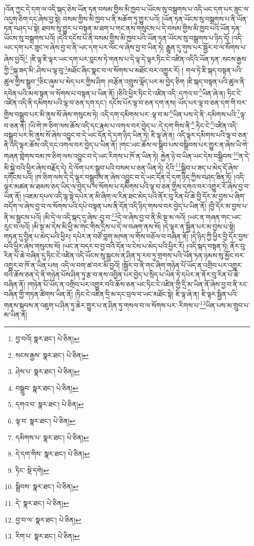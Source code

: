 །འོན་ཀྱང་དེ་དག་ལ་འདི་སྐད་ཅེས་ཡོན་ཏན་བསམ་གྱིས་མི་ཁྱབ་པ་ཡོངས་སུ་བསྒྲགས་པ་འདི་ཡང་དག་པར་ཟུང་ལ་འདུག་ཅིག་དང་ཞེས་བྱ་སྟེ། བསམ་གྱིས་མི་ཁྱབ་པ་ནི་མཆོག་ཏུ་གྱུར་པའོ། །ཡོན་ཏན་ཡོངས་སུ་བསྒྲགས་པ་ནི་ཡོན་ཏན་བཤད་པ་སྟེ། ཐབས་སུ་གྱུར་པ་བསྟན་མ་ཐག་པ་གང་ནས་གསུངས་པ་དེ་བསམ་གྱིས་མི་ཁྱབ་པའི་ཡོན་ཏན་ཡོངས་སུ་བསྒྲགས་པའོ། །དེའི་དངོས་པོ་ནི་བསམ་གྱིས་མི་ཁྱབ་པའི་ཡོན་ཏན་ཡོངས་སུ་བསྒྲགས་པ་ཉིད་དོ། །འདི་ཡང་དག་པར་ཟུང་ལ་ཞེས་བྱ་བ་ནི་ཡང་དག་པར་ལོང་ལ་ཞེས་བྱ་བ་ཡིན་ཏེ། རྒྱུན་དུ་གུས་པར་སྦྱོར་བ་ལ་སོགས་པ་ཞེས་བྱའོ།\footnote{བྱ་བའོ།  སྣར་ཐང་།  པེ་ཅིན། } །ཇི་ལྟ་ཇི་ལྟར་ཡང་དག་པར་བླངས་ཏེ་གནས་པ་དེ་ལྟ་དེ་ལྟར་ཏིང་ངེ་འཛིན་འདིའི་ཡོན་ཏན་:སངས་རྒྱས་ཀྱི་\footnote{སངས་རྒྱས་  སྣར་ཐང་།  པེ་ཅིན། }སྐུ་ཟད་མི་:ཤེས་པ་ལྟ་བུ་\footnote{ཤེས་པ་  སྣར་ཐང་།  པེ་ཅིན། }མཐོང་ཞིང་སྣང་བ་ལ་སོགས་པ་མཐོང་བར་འགྱུར་རོ། །
གལ་ཏེ་ཇི་སྐད་བསྟན་པའི་ཚུལ་གྱིས་སྒྲུབ་\footnote{བསྒྲུབ་  སྣར་ཐང་།  པེ་ཅིན། }ཅིང་ཞུམ་པ་མེད་པར་གྱིས་ཤིག །བརྩོན་འགྲུས་ལྷོད་པར་མ་བྱེད་ཅིག །ཇི་སྐད་བསྟན་པའི་ཚུལ་ནི་དབེན་པའི་མལ་སྟན་ལ་སོགས་པ་བསྟན་པ་ཡིན་ནོ། །ཅིའི་ཕྱིར་ཏིང་ངེ་འཛིན་འདི་:དཀའ་བ་\footnote{དགའ་བ་  སྣར་ཐང་།  པེ་ཅིན། }ཡིན་ཞེ་ན། ཏིང་ངེ་འཛིན་འདི་ནི་དམིགས་པའི་ལྟ་བ་ཅན་དག་དང་། དངོས་པོར་ལྟ་བ་ཅན་དག་ནས། ཡོད་པར་ལྟ་བ་ཅན་དག་གི་བར་གྱིས་བསྒྲུབ་པར་མི་ནུས་སོ་ཞེས་གསུངས་ཏེ། འདི་དག་དམིགས་པར་:ལྟ་བ་མ་\footnote{ལྟ་བ་  སྣར་ཐང་།  པེ་ཅིན། }ཡིན་པས་དེ་ནི་:དམིགས་པའི་\footnote{དམིགས་པ་  སྣར་ཐང་།  པེ་ཅིན། }ལྟ་བ་ཅན་ནོ། །ཡི་གེ་ཁ་ཅིག་ལས་ཆོས་འདི་དང་རྣམ་པ་འགལ་བར་བྱེད་པ་:དེ་དག་གིས་ནི་\footnote{དེ་དག་གིས་  སྣར་ཐང་།  པེ་ཅིན། }:ཏིང་ངེ་\footnote{ཏིང་  སྡེ་དགེ། }འཛིན་འདི་བསྒྲུབ་པར་མི་ནུས་སོ་ཞེས་འབྱུང་བ་དེ་ཡང་དོན་དེ་དག་ཉིད་ཡིན་ཏེ། ཇི་ལྟ་ཞེ་ན། འདི་ལྟར་དམིགས་པའི་ལྟ་བ་ཅན་ནི་འདི་ལྟར་ཆོས་འདི་དང་འགལ་བར་བྱེད་པ་ཡིན་ནོ། །གང་ཡང་ཆོས་ལ་སྒྲིབ་པས་བསྒྲིབས་པར་གྱུར་ན་ཞེས་ཡི་གེ་གཞན་གླེགས་བམ་ཁ་ཅིག་ལས་འབྱུང་བ་དེ་ཡང་རིགས་པ་ཁོ་ན་ཡིན་ཏེ། རྐྱེན་ཉེ་བ་ཡིན་ཡང་དེས་བསྒྲིབས་\footnote{སྒྲིབས་  སྣར་ཐང་།  པེ་ཅིན། }ན་དེ་མི་སྐྱེ་བའི་ཕྱིར་ཞེས་བརྗོད་དེ། དེ་ལོག་པར་སྒྲུབ་པའི་བསམ་པ་ཅན་ཡིན་ཏེ། དེའི་\footnote{དེ་  སྣར་ཐང་།  པེ་ཅིན། }སྒྲིབ་པ་ཟད་པ་མེད་དོ་ཞེས་དགོངས་པའོ། །ཁ་ཅིག་ལས་དེ་དེ་ལྟར་བསྒྲུབས་ན་ཞེས་འབྱུང་བ་དེ་ཡང་དོན་དེ་དག་ཉིད་ཀྱིས་བཤད་ཟིན་ཏོ། །འདི་ལྟར་མཚན་མ་ཐམས་ཅད་ཡིད་ལ་བྱེད་པ་ལ་སོགས་པ་དམིགས་པའི་ལྟ་བ་ཅན་གྱིས་དགའ་བར་འགྱུར་རོ་ཞེས་བྱ་བ་ཡིན་ནོ། །འཇམ་དཔལ་འདི་ལྟ་སྟེ་དཔེར་ན་མི་ཞིག་ལ་རིན་ཐང་མེད་པའི་ནོར་བུ་རིན་པོ་ཆེ་བྱི་དོར་མ་བྱས་པ་ཞིག་བདོག་ལ་ཞེས་བྱ་བ་ལ་སོགས་པའི་དཔེ་བསྟན་པས་ནི་དོན་འདི་ཉིད་གསལ་བར་བྱེད་པ་ཡིན་ནོ། །བྱི་དོར་མ་བྱས་པ་ནི་མ་སྦྱངས་པའོ། །མི་དེ་ལ་འདི་སྐད་དུ་ཞེས་:བྱ་བ་\footnote{བྱ་བ་ལ་  སྣར་ཐང་།  པེ་ཅིན། }དེ་ལ་ཞེས་བྱ་བ་ནི་མི་སྔ་མ་ལའོ། །ཡང་ན་གཞན་གང་ཡང་རུང་བ་ལའོ། །མི་སྔ་མ་དེས་མི་ཕྱི་མ་གང་གིས་དྲིས་པ་དེ་ལ་བཞག་ནས་སོ། །དེ་ལྟར་ན་སྦྱིན་པར་མ་བྱས་པ་སྟེ། གཏན་དུ་བྱིན་པ་མེད་པའི་ཕྱིར། དཔེར་ན་བཙོ་བླག་མཁན་ལ་གོས་བཅོལ་བ་བཞིན་ནོ། །དེ་ཉིད་ཀྱི་ཕྱིར་བྱི་དོར་བྱས་པའི་ཕྱིར་ཞེས་གསུངས་སོ། །ཡང་ན་བདར་བ་བྱ་བའི་དོན་ལ་ངེས་པ་མེད་པའི་ཕྱིར་རོ། །འདི་སྐད་བསྟན་ཏེ། ནོར་བུ་རིན་པོ་ཆེ་བཞིན་དུ་ཏིང་ངེ་འཛིན་འདི་ཡོངས་སུ་སྦྱངས་ན་ཤིན་ཏུ་རབ་ཏུ་གྲགས་པའི་ཡོན་ཏན་ཉམས་སུ་མྱོང་བར་འགྱུར་བ་ཁོ་ན་ཡིན་པས། འདི་ལ་བག་ཚ་བར་མི་བྱའོ། །སྦྱོར་བ་ནི་གང་ཞིག་གཉེན་པོ་ཡོད་ན་འགྲིབ་པར་འགྱུར་བའི་ཆོས་ཅན་དེ་ནི་གཉེན་པོས་ཤིན་ཏུ་རྩ་བ་ནས་འབྱིན་པར་བྱེད་པ་སྲིད་པ་ཡིན་ཏེ་དཔེར་ན་ནོར་བུ་རིན་པོ་ཆེ་བཞིན་ནོ། །གཉེན་པོ་ཡོད་ན་འགྲིབ་པར་འགྱུར་བའི་ཆོས་ཅན་ཡང་ཏིང་ངེ་འཛིན་གྱི་དྲི་མ་ཡིན་ནོ་ཞེས་བྱ་བ་ནི་རང་བཞིན་གྱི་གཏན་ཚིགས་ཡིན་ནོ། །ཏིང་ངེ་འཛིན་དྲི་མ་དང་བྲལ་བ་ཡང་མཐོང་སྟེ། ཇི་ལྟ་ཞེ་ན། ཇི་ལྟར་སྦྱིན་པའི་གནས་སྐབས་ན་འཇུག་པ་ཤིན་ཏུ་ཆེར་གྱུར་པ་ན་ཤིན་ཏུ་གསལ་བ་ལ་སོགས་པར་:རིགས་པ་\footnote{རིག་པ་  སྣར་ཐང་།  པེ་ཅིན། }ཡིན་པས་མ་གྲུབ་པ་མ་ཡིན་ནོ། 
